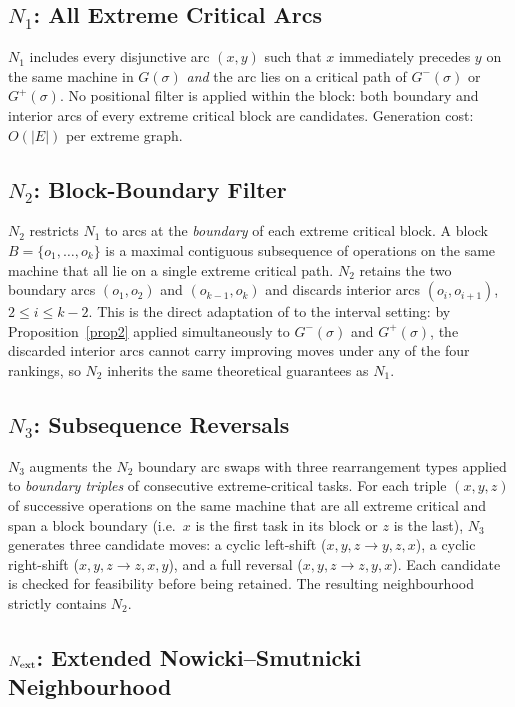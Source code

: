 \documentclass[preprint,12pt]{elsarticle}
\begin{document}
\subsection{$N_1$: All Extreme Critical Arcs}
\label{sec:N1}

$N_1$ includes every disjunctive arc $(x,y)$ such that $x$ immediately precedes $y$ on the same machine in $G(\sigma)$ \emph{and} the arc lies on a critical path of $G^-(\sigma)$ or $G^+(\sigma)$. No positional filter is applied within the block: both boundary and interior arcs of every extreme critical block are candidates. Generation cost: $O(|E|)$ per extreme graph.

\subsection{$N_2$: Block-Boundary Filter}
\label{sec:N2}

$N_2$ restricts $N_1$ to arcs at the \emph{boundary} of each extreme critical block. A block $B = \{o_1,\ldots,o_k\}$ is a maximal contiguous subsequence of operations on the same machine that all lie on a single extreme critical path. $N_2$ retains the two boundary arcs $(o_1,o_2)$ and $(o_{k-1},o_k)$ and discards interior arcs $(o_i,o_{i+1})$, $2 \leq i \leq k-2$. This is the direct adaptation of \cite{Nowicki1996} to the interval setting: by Proposition~\ref{prop2} applied simultaneously to $G^-(\sigma)$ and $G^+(\sigma)$, the discarded interior arcs cannot carry improving moves under any of the four rankings, so $N_2$ inherits the same theoretical guarantees as $N_1$.

\subsection{$N_3$: Subsequence Reversals}
\label{sec:N3}

$N_3$ augments the $N_2$ boundary arc swaps with three rearrangement types applied to \emph{boundary triples} of consecutive extreme-critical tasks. For each triple $(x, y, z)$ of successive operations on the same machine that are all extreme critical and span a block boundary (i.e.\ $x$ is the first task in its block or $z$ is the last), $N_3$ generates three candidate moves: a cyclic left-shift ($x,y,z\to y,z,x$), a cyclic right-shift ($x,y,z\to z,x,y$), and a full reversal ($x,y,z\to z,y,x$). Each candidate is checked for feasibility before being retained. The resulting neighbourhood strictly contains $N_2$.

\subsection{$N_{\rm ext}$: Extended Nowicki--Smutnicki Neighbourhood}
\label{sec:Next}
\end{document}
